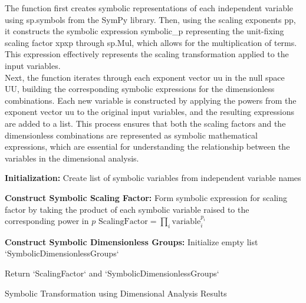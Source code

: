 \documentclass{article}
\begin{document}
The function first creates symbolic representations of each independent variable using sp.symbols from the SymPy library. Then, using the scaling exponents pp, it constructs the symbolic expression symbolic\_p representing the unit-fixing scaling factor xpxp through sp.Mul, which allows for the multiplication of terms. This expression effectively represents the scaling transformation applied to the input variables.\\

Next, the function iterates through each exponent vector uu in the null space UU, building the corresponding symbolic expressions for the dimensionless combinations. Each new variable is constructed by applying the powers from the exponent vector uu to the original input variables, and the resulting expressions are added to a list. This process ensures that both the scaling factors and the dimensionless combinations are represented as symbolic mathematical expressions, which are essential for understanding the relationship between the variables in the dimensional analysis.\\



\begin{algorithm}[H]
\SetAlgoLined
{}

\textbf{Initialization:}\;
Create list of symbolic variables from independent variable names\;

\textbf{Construct Symbolic Scaling Factor:}\;
Form symbolic expression for scaling factor by taking the product of each symbolic variable raised to the corresponding power in \(p\)\;
\( \text{ScalingFactor} = \prod_{i} \text{variable}_i^{p_i} \)\;

\textbf{Construct Symbolic Dimensionless Groups:}\;
Initialize empty list `SymbolicDimensionlessGroups`\;

Return `ScalingFactor` and `SymbolicDimensionlessGroups`\;

\caption{Symbolic Transformation using Dimensional Analysis Results}
\label{alg:symbolic_transformation} %
\end{algorithm}\\
\end{document}
